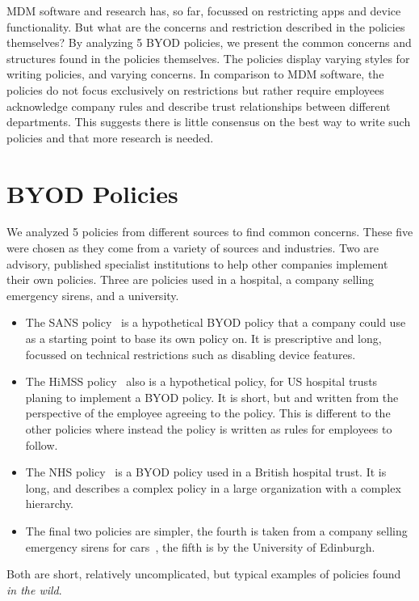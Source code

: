 \documentclass[conference,twocolumn]{IEEEtran}
\begin{document}
MDM software and research has, so far, focussed on restricting apps and device functionality.
But what are the concerns and restriction described in the policies themselves?
By analyzing 5 BYOD policies, we present the common concerns and structures found in the policies themselves.
The policies display varying styles for writing policies, and varying concerns.
In comparison to MDM software, the policies do not focus exclusively on restrictions but rather require employees acknowledge company rules and describe trust relationships between different departments.
This suggests there is little consensus on the best way to write such policies and that more research is needed.

\section{BYOD Policies}
\label{sec:byod_policies}

We analyzed 5 policies from different sources to find common concerns.
These five were chosen as they come from a variety of sources and industries.
Two are advisory, published specialist institutions to help other companies implement their own policies.
Three are policies used in a hospital, a company selling emergency sirens, and a university.
\begin{itemize}
  \item The SANS policy~\cite{nicholas_r._c._guerin_security_2008} is a hypothetical BYOD policy that a company could use as a starting point to base its own policy on.
    It is prescriptive and long, focussed on technical restrictions such as disabling device features.
  \item The HiMSS policy~\cite{healthcare_information_and_management_systems_society_mobile_2012} also is a hypothetical policy, for US hospital trusts planing to implement a BYOD policy.
    It is short, but and written from the perspective of the employee agreeing to the policy.
    This is different to the other policies where instead the policy is written as rules for employees to follow.
  \item The NHS policy~\cite{kennington_mobiles_2014} is a BYOD policy used in a British hospital trust.
    It is long, and describes a complex policy in a large organization with a complex hierarchy.
  \item The final two policies are simpler, the fourth is taken from a company selling emergency sirens for cars~\cite{code3pse.org_sample_????}, the fifth is by the University of Edinburgh.  
\end{itemize}
Both are short, relatively uncomplicated, but typical examples of policies found \emph{in the wild}.
\end{document}
